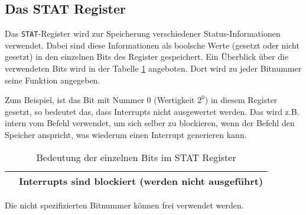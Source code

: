 \subsection{Das STAT Register}

Das \texttt{STAT}-Register wird zur Speicherung verschiedener
Status-Informationen verwendet. Dabei sind diese Informationen als boolsche
Werte (gesetzt oder nicht gesetzt) in den einzelnen Bits des Register
gespeichert. Ein Überblick über die verwendeten Bits wird in der Tabelle
\ref{tab:STAT-register} angeboten. Dort wird zu jeder Bitnummer seine Funktion
angegeben. 

Zum Beispiel, ist das Bit mit Nummer $0$ (Wertigkeit $2^0$) in diesem Register
gesetzt, so bedeutet das, dass Interrupts nicht ausgewertet werden. Das wird
z.B. intern vom Befehl  verwendet, um sich
selber zu blockieren, wenn der Befehl den Speicher anspricht, was wiederum einen
Interrupt generieren kann.


\begin{longtable}{>{\ttfamily}ll}
\caption[STAT Register]{Bedeutung der einzelnen Bits im STAT Register}
\label{tab:STAT-register}
\\\toprule
 0  & Interrupts sind blockiert (werden nicht ausgeführt)   \\
\bottomrule
\end{longtable}

Die nicht spezifizierten Bitnummer können frei verwendet werden.

